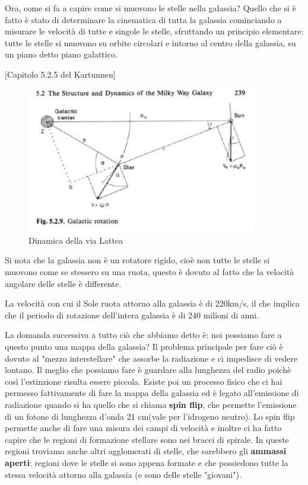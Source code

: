 \documentclass[a4paper,11pt]{article}
\begin{document}
Ora, come si fa a capire come si muovono le stelle nella galassia? Quello che si è fatto è stato di determinare la cinematica di tutta la galassia cominciando a misurare le velocità di tutte e singole le stelle, sfruttando un principio elementare: tutte le stelle si muovono su orbite circolari e intorno al centro della galassia, su un piano detto piano galattico. 

[Capitolo 5.2.5 del Kartunnen]
\begin{figure}[h!!]
        \centering
        \includegraphics[width=10cm]{Dinamica della via lattea.JPG}
        \caption{Dinamica della via Lattea}
        \label{fig:Correnti parassite}
    \end{figure}
Si nota che la galassia non è un rotatore rigido, cioè non tutte le stelle si muovono come se stessero su una ruota, questo è dovuto al fatto che la velocità angolare delle stelle è differente. 

La velocità con cui il Sole ruota attorno alla galassia è di 220km/s, il che implica che il periodo di rotazione dell'intera galassia è di 240 milioni di anni. 

La domanda successiva a tutto ciò che abbiamo detto è: noi possiamo fare a questo punto una mappa della galassia? Il problema principale per fare ciò è dovuto al "mezzo interstellare" che assorbe la radiazione e ci impedisce di vedere lontano. Il meglio che possiamo fare è guardare alla lunghezza del radio poichè così l'estinzione risulta essere piccola. Esiste poi un processo fisico che ci hai permesso fattivamente di fare la mappa della galassia ed è legato all'emissione di radiazione quando si ha quello che si chiama \textbf{spin flip}, che permette l'emissione di un fotone di lunghezza d'onda 21 cm(vale per l'idrogeno neutro). Lo spin flip permette anche di fare una misura dei campi di velocità e inoltre ci ha fatto capire che le regioni di formazione stellare sono nei bracci di spirale. In queste regioni troviamo anche altri agglomerati di stelle, che sarebbero gli \textbf{ammassi aperti}: regioni dove le stelle si sono appena formate e che possiedono tutte la stessa velocità attorno alla galassia (e sono delle stelle "giovani").
\end{document}
